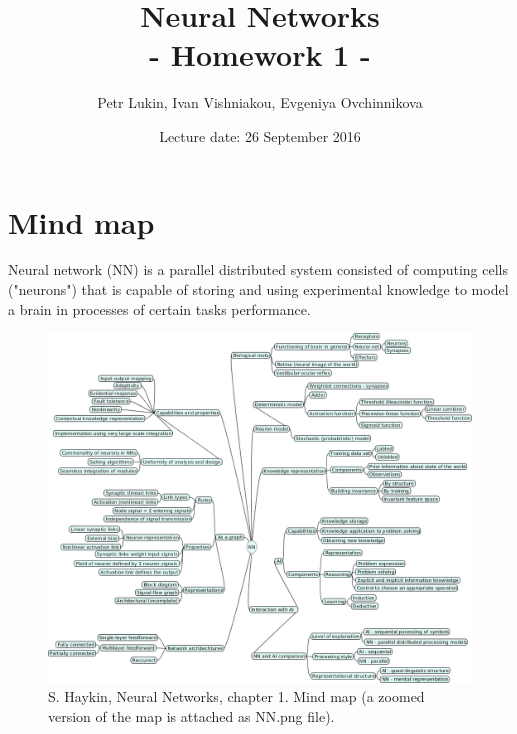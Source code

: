 \documentclass[a4paper, 12pt]{article}
\title{Neural Networks  \\
				- Homework 1 -}
\author{Petr Lukin, Ivan Vishniakou, Evgeniya Ovchinnikova}
\date{Lecture date: 26 September 2016}
\begin{document}
\maketitle

\section{Mind map}
Neural network (NN) is a parallel distributed system consisted of computing cells ("neurons") that is capable of storing and using experimental knowledge to model a brain in processes of certain tasks performance.

\begin{figure}[h]
  \centering
  \caption{S. Haykin, Neural Networks, chapter 1. Mind map (a zoomed version of the map is attached as NN.png file).\label{fig:mindMap}}
  \includegraphics[width=1.0\textwidth]{NN}
\end{figure}
\end{document}
